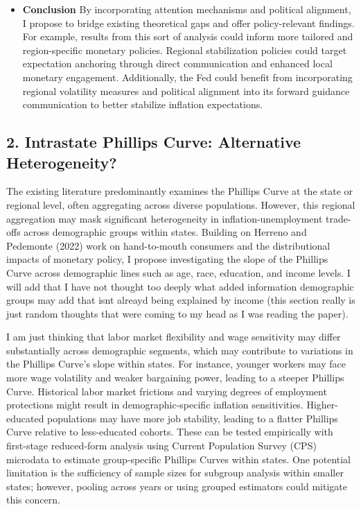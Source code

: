 \documentclass[10pt]{article}
\begin{document}
\begin{itemize}
\item \textbf{Conclusion}
By incorporating attention mechanisms and political alignment, I propose to bridge existing theoretical gaps and offer policy-relevant findings. For example, results from this sort of analysis could inform more tailored and region-specific monetary policies. Regional stabilization policies could target expectation anchoring through direct communication and enhanced local monetary engagement. Additionally, the Fed could benefit from incorporating regional volatility measures and political alignment into its forward guidance communication to better stabilize inflation expectations.
\end{itemize}



\subsection*{2. Intrastate Phillips Curve: Alternative Heterogeneity?}
The existing literature predominantly examines the Phillips Curve at the state or regional level, often aggregating across diverse populations. However, this regional aggregation may mask significant heterogeneity in inflation-unemployment trade-offs across demographic groups within states. Building on Herreno and Pedemonte (2022) work on hand-to-mouth consumers and the distributional impacts of monetary policy, I propose investigating the slope of the Phillips Curve across demographic lines such as age, race, education, and income levels. I will add that I have not thought too deeply what added information demographic groups may add that isnt alreayd being explained by income (this section really is just random thoughts that were coming to my head as I was reading the paper). 

I am just thinking that labor market flexibility and wage sensitivity may differ substantially across demographic segments, which may contribute to variations in the Phillips Curve's slope within states. For instance, younger workers may face more wage volatility and weaker bargaining power, leading to a steeper Phillips Curve. Historical labor market frictions and varying degrees of employment protections might result in demographic-specific inflation sensitivities. Higher-educated populations may have more job stability, leading to a flatter Phillips Curve relative to less-educated cohorts. These can be tested empirically with first-stage reduced-form analysis using Current Population Survey (CPS) microdata to estimate group-specific Phillips Curves within states. One potential limitation is the sufficiency of sample sizes for subgroup analysis within smaller states; however, pooling across years or using grouped estimators could mitigate this concern.
\end{document}
